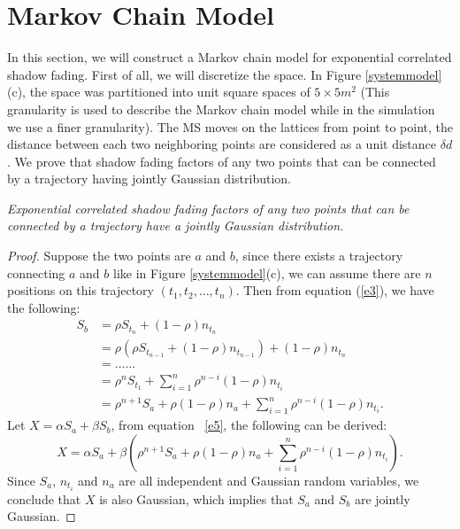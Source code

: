 \section{Markov Chain Model}
\label{sec:markov}
In this section, we will construct a Markov chain model for exponential correlated shadow fading. First of all, we will discretize the space. In Figure \ref{systemmodel}(c), the space was partitioned into unit square spaces of $5\times5m^{2}$ (This granularity is used to describe the Markov chain model while in the simulation we use a finer granularity). The MS moves on the lattices from point to point, the distance between each two neighboring points are considered as a unit distance $\delta d$. We prove that shadow fading factors of any two points that can be connected by a trajectory having jointly Gaussian distribution.
\begin{lem}
\emph{Exponential correlated shadow fading factors of any two points that can be connected by a trajectory have a jointly Gaussian distribution.}
\end{lem}
\begin{proof}Suppose the two points are $a$ and $b$, since there exists a trajectory connecting $a$ and $b$ like in Figure \ref{systemmodel}(c), we can assume there are $n$ positions on this trajectory $(t_{1},t_{2},\dots,t_{n})$. Then from equation (\ref{e3}), we have the following:
\begin{equation}
\label{e5}
\begin{split}
S_{b} &=\rho S_{t_{n}}+(1-\rho)n_{t_{n}}\\
&=\rho(\rho S_{t_{n-1}}+(1-\rho)n_{t_{n-1}})+(1-\rho)n_{t_{n}}\\
&=\ldots\ldots\\
&=\rho^{n}S_{t_{1}}+\sum_{i=1}^{n}\rho^{n-i}(1-\rho)n_{t_{i}}\\
&=\rho^{n+1}S_{a}+\rho(1-\rho)n_{a}+\sum_{i=1}^{n}\rho^{n-i}(1-\rho)n_{t_{i}}.
\end{split}
\end{equation}
Let $X=\alpha S_{a}+\beta S_{b}$, from equation ~\ref{e5}, the following can be derived:
\begin{equation}
X=\alpha S_{a}+\beta(\rho^{n+1}S_{a}+\rho(1-\rho)n_{a}+\sum_{i=1}^{n}\rho^{n-i}(1-\rho)n_{t_{i}}).
\end{equation}
Since $S_{a}$, $n_{t_{i}}$ and $n_{a}$ are all independent and Gaussian random variables, we conclude that $X$ is also Gaussian, which implies that $S_{a}$ and $S_{b}$ are jointly Gaussian.
\end{proof}

